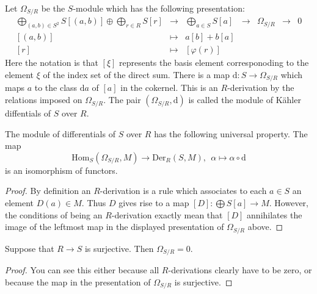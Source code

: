 \medskip\noindent
Let $\Omega_{S/R}$ be the $S$-module which has the
following presentation:
$$
\begin{matrix}
\bigoplus_{(a,b)\in S^2} S[(a,b)] \oplus \bigoplus_{r\in R} S[r]
&
\to
&
\bigoplus_{a\in S} S [a]
&
\to
&
\Omega_{S/R}
&
\to
&
0
\\
[(a,b)]
&
\mapsto
&
a[b] + b[a]
&
&
&
&
\\
[r]
&
\mapsto
&
[\varphi(r)]
&
&
&
&
\end{matrix}
$$
Here the notation is that $[\xi]$ represents the basis
element corresponoding to the element $\xi$ of the index set
of the direct sum. There is a map $\text{d} : S \to \Omega_{S/R}$
which maps $a$ to the class $\text{d}a$ of $[a]$ in the cokernel.
This is an $R$-derivation by the relations imposed on $\Omega_{S/R}$.
The pair $(\Omega_{S/R}, \text{d})$ is called the module
of K\"ahler diffentials of $S$ over $R$.

\begin{lemma}
\label{lemma-universal-omega}
The module of differentials of $S$ over $R$ has the following
universal property. The map
$$
\text{Hom}_S(\Omega_{S/R}, M)
\longrightarrow
\text{Der}_R(S, M),\ \ 
\alpha 
\longmapsto
\alpha \circ \text{d}
$$
is an isomorphism of functors.
\end{lemma}

\begin{proof}
By definition an $R$-derivation is a rule which associates
to each $a \in S$ an element $D(a) \in M$. Thus $D$ gives
rise to a map $[D] : \bigoplus S[a] \to M$. However, the conditions
of being an $R$-derivation exactly mean that $[D]$ annihilates
the image of the leftmost map in the displayed presentation of
$\Omega_{S/R}$ above.
\end{proof}

\begin{lemma}
\label{lemma-trivial-differential-surjective}
Suppose that $R \to S$ is surjective.
Then $\Omega_{S/R} = 0$.
\end{lemma}

\begin{proof}
You can see this either because all $R$-derivations
clearly have to be zero, or because
the map in the presentation of $\Omega_{S/R}$ is surjective.
\end{proof}

